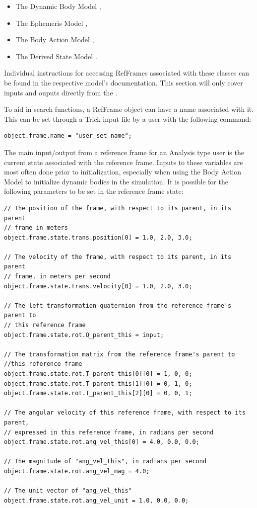 \begin{itemize}
\item{The Dynamic Body Model} \cite{dynenv:DYNBODY},
\item{The Ephemeris Model} \cite{dynenv:EPHEMERIDES},
\item{The Body Action Model} \cite{dynenv:BODYACTION},
\item{The Derived State Model} \cite{dynenv:DERIVEDSTATE}.
\end{itemize}

Individual instructions for accessing RefFrames associated with these
classes can be found in the respective model's documentation. This
section will only cover inputs and ouputs directly
from the .

To aid in search functions, a RefFrame object can have a name associated
with it. This can be set through a Trick input file by a user with
the following command:

\begin{verbatim}
object.frame.name = "user_set_name";
\end{verbatim}

The main input/output from a reference frame for an Analysis type user is
the current state associated with the reference frame. Inputs to these
variables are most often done prior to initialization, especially when using
the Body Action Model \cite{dynenv:BODYACTION} to initialize dynamic bodies
in the simulation. It is possible for the following parameters to be set
in the reference frame state:

\begin{verbatim}
// The position of the frame, with respect to its parent, in its parent
// frame in meters
object.frame.state.trans.position[0] = 1.0, 2.0, 3.0;

// The velocity of the frame, with respect to its parent, in its parent
// frame, in meters per second
object.frame.state.trans.velocity[0] = 1.0, 2.0, 3.0;

// The left transformation quaternion from the reference frame's parent to
// this reference frame
object.frame.state.rot.Q_parent_this = input;

// The transformation matrix from the reference frame's parent to
//this reference frame
object.frame.state.rot.T_parent_this[0][0] = 1, 0, 0;
object.frame.state.rot.T_parent_this[1][0] = 0, 1, 0;
object.frame.state.rot.T_parent_this[2][0] = 0, 0, 1;

// The angular velocity of this reference frame, with respect to its parent,
// expressed in this reference frame, in radians per second
object.frame.state.rot.ang_vel_this[0] = 4.0, 0.0, 0.0;

// The magnitude of "ang_vel_this", in radians per second
object.frame.state.rot.ang_vel_mag = 4.0;

// The unit vector of "ang_vel_this"
object.frame.state.rot.ang_vel_unit = 1.0, 0.0, 0.0;

\end{verbatim}

